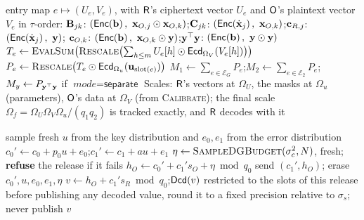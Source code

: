 \begin{algorithm}[p]
\caption{\textsc{Aggregate} and pack ($\Op$, Phase~3)}
\label{alg:aggregate}
\small
\begin{algorithmic}[1]
\Require entry map $e\mapsto(U_e,V_e)$, with $\textsf{R}$'s ciphertext vector $U_e$ and $\Op$'s plaintext vector $V_e$ in $\tau$-order:
\Statex \quad $\mathbf{B}_{jk}$: $(\mathsf{Enc}\!\left(\mathbf{b}\right),\ \mathbf{x}_{O,j}\odot\mathbf{x}_{O,k})$;\quad $\mathbf{C}_{jk}$: $(\mathsf{Enc}\!\left(\dot{\mathbf{x}}_j\right),\ \mathbf{x}_{O,k})$;\quad $\mathbf{c}_{R,j}$: $(\mathsf{Enc}\!\left(\dot{\mathbf{x}}_j\right),\ \mathbf{y})$;
\Statex \quad $\mathbf{c}_{O,k}$: $(\mathsf{Enc}\!\left(\mathbf{b}\right),\ \mathbf{x}_{O,k}\odot\mathbf{y})$;\quad $\mathbf{y}^\top\mathbf{y}$: $(\mathsf{Enc}\!\left(\mathbf{b}\right),\ \mathbf{y}\odot\mathbf{y})$
  \State $T_e\gets\textsc{EvalSum}\bigl(\textsc{Rescale}\bigl(\sum_{h\le m}U_e[h]\odot\mathsf{Ecd}_{\Omega_V}(V_e[h])\bigr)\bigr)$ 
  \State $P_e\gets\textsc{Rescale}\bigl(T_e\odot\mathsf{Ecd}_{\Omega_u}(\mathbf u_{\mathrm{slot}(e)})\bigr)$ 
\EndFor
\State $M_1\gets\sum_{e\in\mathcal E_G}P_e$;\quad $M_2\gets\sum_{e\in\mathcal E_2}P_e$;\quad $M_y\gets P_{\mathbf{y}^\top\mathbf{y}}$ if $\textit{mode}=\textsf{separate}$ 
\Statex Scales: $\textsf{R}$'s vectors at $\Omega_U$, the masks at $\Omega_u$ (parameters), $\Op$'s data at $\Omega_V$ (from \textsc{Calibrate}); the final scale $\Omega_f=\Omega_U\Omega_V\Omega_u/(q_1q_2)$ is tracked exactly, and $\textsf{R}$ decodes with it
\end{algorithmic}
\end{algorithm}

\begin{algorithm}[p]
\caption{\textsc{Release}$(M,\sigma_c)$: one DP release (Phase~4)}
\label{alg:release}
\small
\begin{algorithmic}[1]
\State \Odo sample fresh $u$ from the key distribution and $e_0,e_1$ from the error distribution
\State \Odo $c_0'\gets c_0+p_0u+e_0$;\quad $c_1'\gets c_1+au+e_1$ 
\State \Odo $\eta\gets\textsc{SampleDGBudget}(\sigma_c^2,N)$, fresh; \textbf{refuse} the release if it fails 
\State \Odo $h_O\gets c_0'+c_1's_O+\eta\bmod q_0$
\State \Odo send $(c_1',h_O)$; erase $c_0',u,e_0,e_1,\eta$ 
\State \Rdo $v\gets h_O+c_1's_R\bmod q_0$;\quad \Return $\mathsf{Dcd}(v)$ restricted to the slots of this release 
\State \Rdo before publishing any decoded value, round it to a fixed precision relative to $\sigma_s$; never publish $v$ 
\end{algorithmic}
\end{algorithm}

